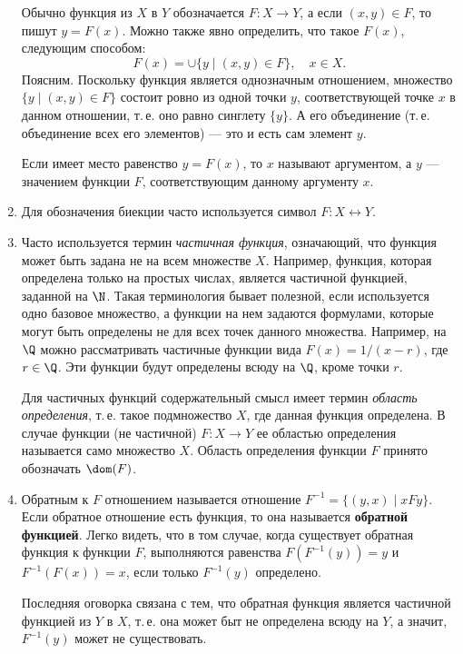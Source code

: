\begin{enumerate}
Обычно функция из $X$ в $Y$ обозначается $F:X\to Y$, а если $(x,y)\in F$, то пишут $y=F(x)$. Можно также явно определить, что такое $F(x)$, следующим способом:
$$
F(x) = \cup\{y\mid (x,y)\in F\},\quad x\in X.
$$
Поясним. Поскольку функция является однозначным отношением, множество $\{y\mid (x,y)\in F\}$ состоит ровно из одной точки $y$, соответствующей точке $x$ в данном отношении, т.\,е. оно равно синглету $\{y\}$. А его объединение (т.\,е. объединение всех его элементов) --- это и есть сам элемент $y$.

Если имеет место равенство $y=F(x)$, то $x$ называют аргументом, а $y$ --- значением функции $F$, соответствующим данному аргументу $x$.

\item Для обозначения биекции часто используется символ $F:X\leftrightarrow Y$.

\item Часто используется термин \textit{частичная функция}, означающий, что функция может быть задана не на всем множестве $X$. Например, функция, которая определена только на простых числах, является частичной функцией, заданной на $\N$. Такая терминология бывает полезной, если используется одно базовое множество, а функции на нем задаются формулами, которые могут быть определены не для всех точек данного множества. Например, на $\Q$ можно рассматривать частичные функции вида $F(x)=1/(x-r)$, где $r\in \Q$. Эти функции будут определены всюду на $\Q$, кроме точки $r$.

Для частичных функций содержательный смысл имеет термин \textit{область определения}, т.\,е. такое подмножество $X$, где данная функция определена. В случае функции (не частичной) $F:X\to Y$ ее областью определения называется само множество $X$. Область определения функции $F$ принято обозначать $\dom(F)$.

\item Обратным к $F$ отношением называется отношение $F^{-1}=\{(y,x)\mid xFy\}$. Если обратное отношение есть функция, то она называется \textbf{обратной функцией}. Легко видеть, что в том случае, когда существует обратная функция к функции $F$, выполняются равенства $F(F^{-1}(y))=y$ и $F^{-1}(F(x))=x$, если только $F^{-1}(y)$ определено.

Последняя оговорка связана с тем, что обратная функция является частичной функцией из $Y$ в $X$, т.\,е. она может быт не определена всюду на $Y$, а значит, $F^{-1}(y)$ может не существовать.


\end{enumerate}
